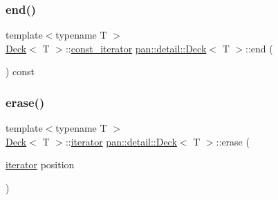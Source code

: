 \mbox{\label{classpan_1_1detail_1_1_deck_a612c8366fcec0ee40c617d7585a57726}} 
\subsubsection{\texorpdfstring{end()}{end()}\hspace{0.1cm}{\footnotesize\ttfamily [2/2]}}
{\footnotesize\ttfamily template$<$typename T $>$ \\
\hyperlink{classpan_1_1detail_1_1_deck}{Deck}$<$ T $>$\+::\hyperlink{classpan_1_1detail_1_1_deck_addc18d2f40aa396f6358bb019d088728}{const\+\_\+iterator} \hyperlink{classpan_1_1detail_1_1_deck}{pan\+::detail\+::\+Deck}$<$ T $>$\+::end (\begin{DoxyParamCaption}{ }\end{DoxyParamCaption}) const\hspace{0.3cm}{\ttfamily [inline]}}

\mbox{\label{classpan_1_1detail_1_1_deck_ade33e6822a72ec2031def23a7a4d6cfc}} 
\subsubsection{\texorpdfstring{erase()}{erase()}}
{\footnotesize\ttfamily template$<$typename T $>$ \\
\hyperlink{classpan_1_1detail_1_1_deck}{Deck}$<$ T $>$\+::\hyperlink{classpan_1_1detail_1_1_deck_a8b4adeae73d035d2bbe3fdfcb65ed1b1}{iterator} \hyperlink{classpan_1_1detail_1_1_deck}{pan\+::detail\+::\+Deck}$<$ T $>$\+::erase (\begin{DoxyParamCaption}\item[{\hyperlink{classpan_1_1detail_1_1_deck_a8b4adeae73d035d2bbe3fdfcb65ed1b1}{iterator}}]{position }\end{DoxyParamCaption})\hspace{0.3cm}{\ttfamily [inline]}}

\mbox{\label{classpan_1_1detail_1_1_deck_a51a44400a7614735bcb5e560ea48da48}} 
